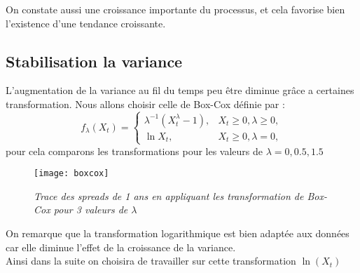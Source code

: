     On constate aussi une croissance importante du processus, et cela favorise bien
    l'existence d'une tendance croissante.

    \subsection{Stabilisation la variance}
        L'augmentation de la variance au fil du temps peu être diminue grâce a
        certaines transformation. Nous allons choisir celle  de Box-Cox définie par :
        \[
            f_\lambda(X_t)=
            \begin{cases}
                \lambda^{-1}(X_t^\lambda - 1), & X_t \geq 0,\lambda \ge 0, \\
                \ln X_t,                       & X_t \ge  0,\lambda  =   0,
            \end{cases}
        \]
        pour cela comparons les transformations pour les valeurs de
        $\lambda=0,0.5,1.5$
        \begin{figure}[H]
            \centering 
            \label{fig:Boxcox} 
            \texttt{[image: boxcox]} 
            \caption{\it Trace des spreads de 1 ans en appliquant les
            transformation de Box-Cox pour 3 valeurs de $\lambda$ } 
        \end{figure} 
        On remarque que la transformation logarithmique est bien adaptée  aux
        données car elle diminue l'effet de la croissance de la variance.\\
        Ainsi dans la suite on choisira de travailler sur cette transformation
        $\ln(X_t)$


       

